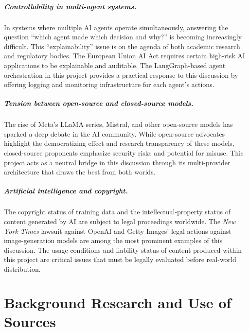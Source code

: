 \documentclass[11pt,a4paper]{report}
\begin{document}
\paragraph{Controllability in multi-agent systems.}
In systems where multiple AI agents operate simultaneously, answering the
question ``which agent made which decision and why?'' is becoming increasingly
difficult. This ``explainability'' issue is on the agenda of both academic
research and regulatory bodies. The European Union AI Act requires certain
high-risk AI applications to be explainable and auditable. The
LangGraph-based agent orchestration in this project provides a practical
response to this discussion by offering logging and monitoring infrastructure
for each agent's actions.

\paragraph{Tension between open-source and closed-source models.}
The rise of Meta's LLaMA series, Mistral, and other open-source models has
sparked a deep debate in the AI community. While open-source advocates
highlight the democratizing effect and research transparency of these
models, closed-source proponents emphasize security risks and potential for
misuse. This project acts as a neutral bridge in this discussion through its
multi-provider architecture that draws the best from both worlds.

\paragraph{Artificial intelligence and copyright.}
The copyright status of training data and the intellectual-property status of
content generated by AI are subject to legal proceedings worldwide. The
\emph{New York Times} lawsuit against OpenAI and Getty Images' legal actions
against image-generation models are among the most prominent examples of
this discussion. The usage conditions and liability status of content
produced within this project are critical issues that must be legally
evaluated before real-world distribution.

\chapter{Background Research and Use of Sources}
\end{document}
